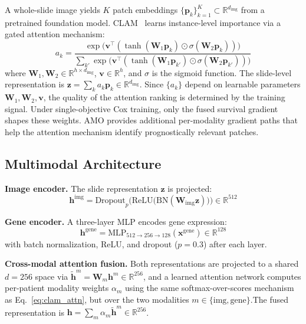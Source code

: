 \documentclass[10pt,twocolumn,letterpaper]{article}
\begin{document}
A whole-slide image yields $K$ patch embeddings
$\{\mathbf{p}_k\}_{k=1}^K \subset \mathbb{R}^{d_{\text{img}}}$
from a pretrained foundation model.
CLAM~\cite{lu2021abmil} learns instance-level importance via
a gated attention mechanism:
\begin{equation}
a_k = \frac{
  \exp\!\bigl(\mathbf{v}^\top (\tanh(\mathbf{W}_1 \mathbf{p}_k)
  \odot \sigma(\mathbf{W}_2 \mathbf{p}_k))\bigr)
}{
  \sum_{k'} \exp\!\bigl(\mathbf{v}^\top (\tanh(\mathbf{W}_1
  \mathbf{p}_{k'}) \odot \sigma(\mathbf{W}_2 \mathbf{p}_{k'}))\bigr)
}
\label{eq:clam_attn}
\end{equation}
where $\mathbf{W}_1, \mathbf{W}_2 \in
\mathbb{R}^{h \times d_{\text{img}}}$,
$\mathbf{v} \in \mathbb{R}^h$, and $\sigma$ is the sigmoid
function. The slide-level representation is
$\mathbf{z} = \sum_k a_k \mathbf{p}_k \in
\mathbb{R}^{d_{\text{img}}}$.
Since $\{a_k\}$ depend on learnable parameters
$\mathbf{W}_1, \mathbf{W}_2, \mathbf{v}$, the quality of the
attention ranking is determined by the training signal. Under
single-objective Cox training, only the fused survival gradient
shapes these weights. AMO provides additional per-modality gradient
paths that help the attention mechanism identify prognostically
relevant patches.

\subsection{Multimodal Architecture}

\textbf{Image encoder.}
The slide representation $\mathbf{z}$ is projected:
\begin{equation}
\mathbf{h}^{\text{img}} = \text{Dropout}_{p}\!\bigl(
\text{ReLU}\bigl(\text{BN}(\mathbf{W}_{\text{img}}
\mathbf{z})\bigr)\bigr)
\in \mathbb{R}^{512}
\label{eq:img_enc}
\end{equation}

\noindent\textbf{Gene encoder.}
A three-layer MLP encodes gene expression:
\begin{equation}
\mathbf{h}^{\text{gene}} = \text{MLP}_{512 \to 256 \to 128}(
\mathbf{x}^{\text{gene}})
\in \mathbb{R}^{128}
\label{eq:gene_enc}
\end{equation}
with batch normalization, ReLU, and dropout ($p\!=\!0.3$) after
each layer.

\noindent\textbf{Cross-modal attention fusion.}
Both representations are projected to a shared $d\!=\!256$ space
via $\tilde{\mathbf{h}}^m = \mathbf{W}_m \mathbf{h}^m \in
\mathbb{R}^{256}$, and a learned attention network computes
per-patient modality weights $\alpha_m$ using the same
softmax-over-scores mechanism as Eq.~\ref{eq:clam_attn},
but over the two modalities $m \in \{\text{img}, \text{gene}\}$.The fused representation is
$\mathbf{h} = \sum_m \alpha_m \tilde{\mathbf{h}}^m \in
\mathbb{R}^{256}$.
\end{document}
